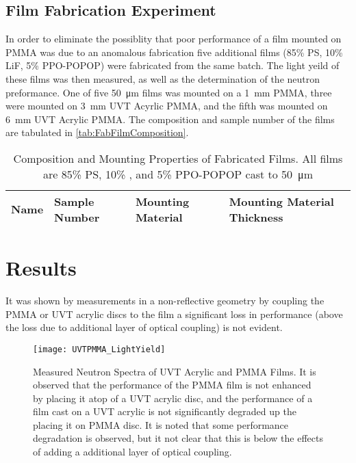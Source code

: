 \documentclass[draftcls,onecolumn]{IEEEtran}
\begin{document}
\subsection{Film Fabrication Experiment}
In order to eliminate the possiblity that poor performance of a film mounted on PMMA was due to an anomalous fabrication five additional films (85\% PS, 10\% LiF, 5\% PPO-POPOP) were fabricated from the same batch.
The light yeild of these films was then measured, as well as the determination of the neutron preformance.
One of five \SI{50}{\um} films was mounted on a \SI{1}{\mm} PMMA, three were mounted on \SI{3}{\mm} UVT Acyrlic PMMA, and the fifth was mounted on \SI{6}{\mm} UVT Acrylic PMMA.
The composition and sample number of the films are tabulated in \autoref{tab:FabFilmComposition}.
\begin{table}
	\centering
	\caption[Fabricated PS Films]{Composition and Mounting Properties of Fabricated Films. All films are 85\% PS, 10\% , and 5\% PPO-POPOP cast to \SI{50}{\um}}
	\label{tab:FabFilmComposition}
  \begin{tabular}{p{5.5cm} | m{1cm} m{2.5cm} m{3cm}}
  \toprule
  Name&Sample Number&Mounting Material& Mounting Material Thickness\\
  \midrule
  \bottomrule
  \end{tabular}
\end{table}
\section{Results}

It was shown by measurements in a non-reflective geometry by coupling the PMMA or UVT acrylic discs to the film a significant loss in performance (above the loss due to additional layer of optical coupling) is not evident.
\begin{figure}
  \centering
  \texttt{[image: UVTPMMA\_LightYield]}
  \caption[Measured Effect of UVT acrylic and PMMA]{Measured Neutron Spectra of UVT Acrylic and PMMA Films. It is observed that the performance of the PMMA film is not enhanced by placing it atop of a UVT acrylic disc, and the performance of a film cast on a UVT acrylic is not significantly degraded up the placing it on PMMA disc. It is noted that some performance degradation is observed, but it not clear that this is below the effects of adding a additional layer of optical coupling.}
  \label{fig:RadMeasuredExper}
\end{figure}
\end{document}
